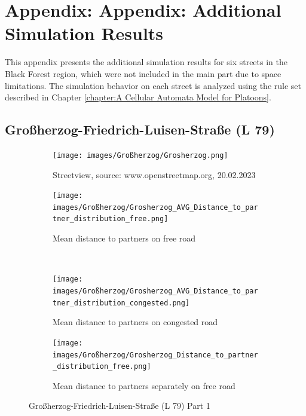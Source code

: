 \chapter{Appendix: Appendix: Additional Simulation Results}
\label{chapter:Appendix: Appendix: Additional Simulation Results}
This appendix presents the additional simulation results for six streets in the Black Forest region, which were not included in the main part due to space limitations. The simulation behavior on each street is analyzed using the rule set described in Chapter \ref{chapter:A Cellular Automata Model for Platoons}. 


\section{Großherzog-Friedrich-Luisen-Straße (L 79)}

\begin{figure}[H]
    \centering
    \begin{subfigure}[b]{0.45\textwidth}
        \centering
        \texttt{[image: images/Großherzog/Grosherzog.png]}
        \caption{Streetview, source: www.openstreetmap.org, 20.02.2023}
    \end{subfigure}
    \hfill
    \begin{subfigure}[b]{0.45\textwidth}
        \centering
        \texttt{[image: images/Großherzog/Grosherzog\_AVG\_Distance\_to\_partner\_distribution\_free.png]}
        \caption{Mean distance to partners on free road}
    \end{subfigure}
    \\
    \begin{subfigure}[b]{0.45\textwidth}
        \centering
        \texttt{[image: images/Großherzog/Grosherzog\_AVG\_Distance\_to\_partner\_distribution\_congested.png]}
        \caption{Mean distance to partners on congested road}
    \end{subfigure}
    \hfill
    \begin{subfigure}[b]{0.45\textwidth}
        \centering
        \texttt{[image: images/Großherzog/Grosherzog\_Distance\_to\_partner\_distribution\_free.png]}
        \caption{Mean distance to partners separately on free road}
    \end{subfigure}
    \caption{Großherzog-Friedrich-Luisen-Straße (L 79) Part 1}
\end{figure}

